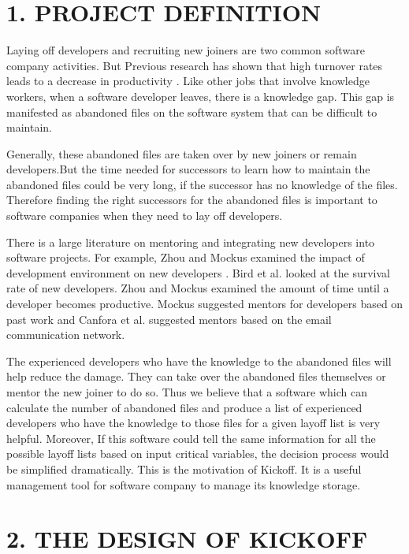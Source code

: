 \documentclass[12pt, a4paper, openright]{report}
\begin{document}
\section*{1. PROJECT DEFINITION}
Laying off developers and recruiting new joiners are two common software company activities. But Previous research has shown that high turnover rates leads to a decrease in productivity \cite{Guthrie2001AMJ}. 
Like other jobs that involve knowledge workers, 
when a software developer leaves, there is a knowledge gap. This gap is manifested as abandoned
files on the software system that can be difficult to maintain.


Generally, these abandoned files are taken over by new joiners or remain developers.But the time needed for successors to learn how to maintain the abandoned files could be very long, if the successor has no knowledge of the files. Therefore finding the right successors for the abandoned files is important to software companies when they need to lay off developers.

 There is a large literature on mentoring and integrating new developers into software projects. For example, Zhou and Mockus examined the impact of development environment on new developers\cite{Zhou2011ICSE} . Bird et al. \cite{Bird2007MSR} looked at the survival rate of new developers. Zhou and Mockus examined the amount of time until a developer becomes productive. Mockus \cite{Mockus2010FSE} suggested mentors for developers based on past work and Canfora et al. \cite{Canfora2012FSE} suggested mentors based on the email communication network. 
 
 The experienced developers who have the knowledge to the abandoned files will help reduce the damage. They can take over the abandoned files themselves or mentor the new joiner to do so. Thus we believe that a software which can calculate the number of abandoned files and produce a list of experienced  developers who have the knowledge to those files for a given layoff list is very helpful. Moreover, If this software could tell the same information for all the possible layoff lists based on input critical variables, the decision process would be simplified dramatically. This is the motivation of Kickoff. It is a useful management tool for software company to manage its knowledge storage.



\newpage
\section*{2. THE DESIGN OF KICKOFF}
\end{document}
